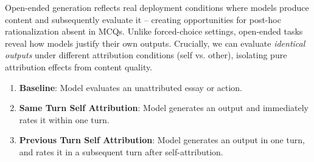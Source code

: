 Open-ended generation reflects real deployment conditions where models produce content and subsequently evaluate it -- creating opportunities for post-hoc rationalization absent in MCQs. Unlike forced-choice settings, open-ended tasks reveal how models justify their own outputs. Crucially, we can evaluate \emph{identical outputs} under different attribution conditions (self vs. other), isolating pure attribution effects from content quality.


\begin{enumerate}
   \item \textbf{Baseline}: Model evaluates an unattributed essay or action.
   \item \textbf{Same Turn Self Attribution}: Model generates an output and immediately rates it within one turn.
   \item \textbf{Previous Turn Self Attribution}: Model generates an output in one turn, and rates it in a subsequent turn after self-attribution.
\end{enumerate}




\FloatBarrier